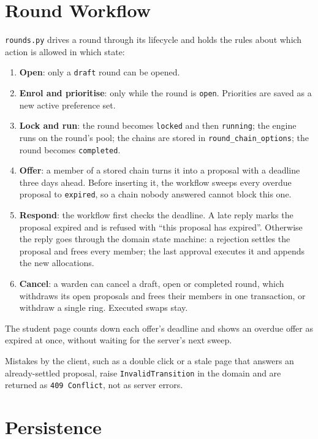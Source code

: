 \section{Round Workflow}

\texttt{rounds.py} drives a round through its lifecycle and holds the
rules about which action is allowed in which state:

\begin{enumerate}
  \item \textbf{Open}: only a \texttt{draft} round can be opened.
  \item \textbf{Enrol and prioritise}: only while the round is
  \texttt{open}. Priorities are saved as a new active preference set.
  \item \textbf{Lock and run}: the round becomes \texttt{locked} and
  then \texttt{running}; the engine runs on the round's pool; the chains
  are stored in \texttt{round\_chain\_options}; the round becomes
  \texttt{completed}.
  \item \textbf{Offer}: a member of a stored chain turns it into a
  proposal with a deadline three days ahead. Before inserting it, the
  workflow sweeps every overdue proposal to \texttt{expired}, so a chain
  nobody answered cannot block this one.
  \item \textbf{Respond}: the workflow first checks the deadline. A late
  reply marks the proposal expired and is refused with ``this proposal
  has expired''. Otherwise the reply goes through the domain state
  machine: a rejection settles the proposal and frees every member; the
  last approval executes it and appends the new allocations.
  \item \textbf{Cancel}: a warden can cancel a draft, open or completed
  round, which withdraws its open proposals and frees their members in
  one transaction, or withdraw a single ring. Executed swaps stay.
\end{enumerate}

The student page counts down each offer's deadline and shows an overdue
offer as expired at once, without waiting for the server's next sweep.

Mistakes by the client, such as a double click or a stale page that
answers an already-settled proposal, raise \texttt{InvalidTransition} in
the domain and are returned as \texttt{409 Conflict}, not as server
errors.

\section{Persistence}


